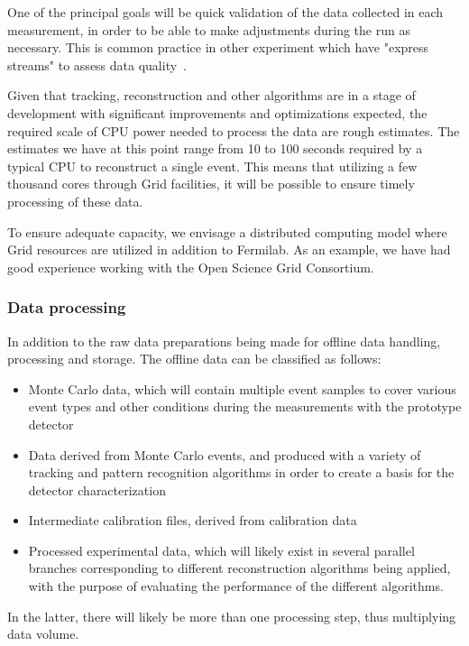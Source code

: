 One of the principal goals will be quick validation of the data collected in each measurement, in
order to be able to make adjustments during the run as necessary. 
This is common practice in other experiment which have "express streams" to assess data quality~\cite{atlas_express}.


Given that tracking, reconstruction and other algorithms are in a stage of development with significant improvements
and optimizations expected, the required scale of CPU power needed to process the data are rough estimates.
The estimates we have at this point range from 10 to 100 seconds required by a typical
CPU to reconstruct a single event. 
This means that utilizing a few thousand cores through Grid facilities, it will be possible to ensure timely processing of these data.

To ensure adequate capacity, we envisage a distributed computing model where Grid resources are utilized in addition to Fermilab.
As an example, we have had good experience working with the Open Science Grid Consortium.


\subsubsection{Data processing}
\label{dataprocess}

In addition to the raw data preparations being made for offline data handling, processing and storage.
The offline data can be classified as follows:
\begin{itemize}
\item Monte Carlo data, which will contain multiple event samples to cover various event types and other conditions during the measurements with the prototype detector
\item Data derived from Monte Carlo events, and produced with a variety of tracking and pattern recognition algorithms in order to create a basis for the detector characterization
\item Intermediate calibration files, derived from calibration data
\item Processed experimental data, which will likely exist in several parallel branches corresponding to different reconstruction algorithms being applied, with the purpose of evaluating the performance of the different algorithms.
\end{itemize}

In the latter, there will likely be more than one processing step, thus multiplying data volume. 


